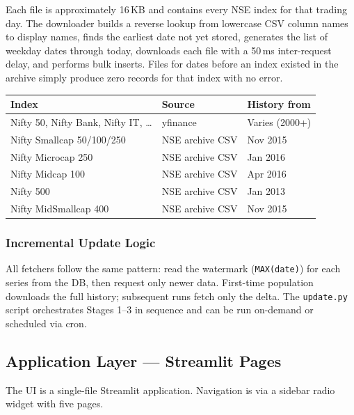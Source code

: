\documentclass[12pt, a4paper]{article}
\begin{document}
Each file is approximately 16\,KB and contains every NSE index for that trading
day.  The downloader builds a reverse lookup from lowercase CSV column names to
display names, finds the earliest date not yet stored, generates the list of
weekday dates through today, downloads each file with a 50\,ms inter-request
delay, and performs bulk inserts.  Files for dates before an index existed in
the archive simply produce zero records for that index with no error.

\begin{center}
\begin{tabular}{@{}lll@{}}
\toprule
\textbf{Index} & \textbf{Source} & \textbf{History from} \\
\midrule
Nifty 50, Nifty Bank, Nifty IT, \ldots & yfinance & Varies (2000+) \\
Nifty Smallcap 50/100/250 & NSE archive CSV & Nov 2015 \\
Nifty Microcap 250 & NSE archive CSV & Jan 2016 \\
Nifty Midcap 100 & NSE archive CSV & Apr 2016 \\
Nifty 500 & NSE archive CSV & Jan 2013 \\
Nifty MidSmallcap 400 & NSE archive CSV & Nov 2015 \\
\bottomrule
\end{tabular}
\end{center}

\subsubsection{Incremental Update Logic}

All fetchers follow the same pattern: read the watermark (\texttt{MAX(date)})
for each series from the DB, then request only newer data.  First-time
population downloads the full history; subsequent runs fetch only the delta.
The \texttt{update.py} script orchestrates Stages 1--3 in sequence and can be
run on-demand or scheduled via cron.

\subsection{Application Layer — Streamlit Pages}

The UI is a single-file Streamlit application.  Navigation is via a sidebar
radio widget with five pages.
\end{document}
